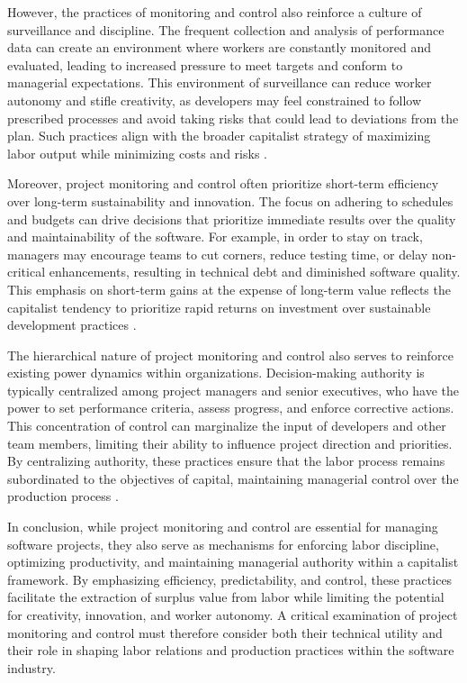 \begin{refsection}
However, the practices of monitoring and control also reinforce a culture of surveillance and discipline. The frequent collection and analysis of performance data can create an environment where workers are constantly monitored and evaluated, leading to increased pressure to meet targets and conform to managerial expectations. This environment of surveillance can reduce worker autonomy and stifle creativity, as developers may feel constrained to follow prescribed processes and avoid taking risks that could lead to deviations from the plan. Such practices align with the broader capitalist strategy of maximizing labor output while minimizing costs and risks \cite[pp.~201-204]{Edwards1980ContestedTerrain}.

Moreover, project monitoring and control often prioritize short-term efficiency over long-term sustainability and innovation. The focus on adhering to schedules and budgets can drive decisions that prioritize immediate results over the quality and maintainability of the software. For example, in order to stay on track, managers may encourage teams to cut corners, reduce testing time, or delay non-critical enhancements, resulting in technical debt and diminished software quality. This emphasis on short-term gains at the expense of long-term value reflects the capitalist tendency to prioritize rapid returns on investment over sustainable development practices \cite[pp.~182-184]{Brooks1995MythicalManMonth}.

The hierarchical nature of project monitoring and control also serves to reinforce existing power dynamics within organizations. Decision-making authority is typically centralized among project managers and senior executives, who have the power to set performance criteria, assess progress, and enforce corrective actions. This concentration of control can marginalize the input of developers and other team members, limiting their ability to influence project direction and priorities. By centralizing authority, these practices ensure that the labor process remains subordinated to the objectives of capital, maintaining managerial control over the production process \cite[pp.~55-57]{Taylor2009ScientificManagement}.

In conclusion, while project monitoring and control are essential for managing software projects, they also serve as mechanisms for enforcing labor discipline, optimizing productivity, and maintaining managerial authority within a capitalist framework. By emphasizing efficiency, predictability, and control, these practices facilitate the extraction of surplus value from labor while limiting the potential for creativity, innovation, and worker autonomy. A critical examination of project monitoring and control must therefore consider both their technical utility and their role in shaping labor relations and production practices within the software industry.


\end{refsection}
